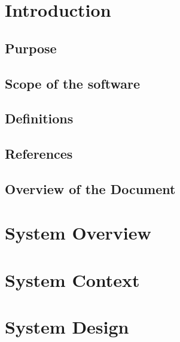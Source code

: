 \def\thedocument{User Requirements Document}
\def\thedate{DATE} %
\def\theversion{0.1}
\def\thestatus{Working copy}






\section{Introduction}
  \label{sec:introduction}
  \subsection{Purpose}
    \label{sec:purpose}
    
  \subsection{Scope of the software}
    \label{sec:scope_of_the_software}
    
  \subsection{Definitions} 
    \label{sec:definitions}
    
  \subsection{References}
    \label{sec:references}
    
  \subsection{Overview of the Document}
    \label{sec:overview_of_the_document}
    

\section{System Overview}
  \label{sec:system_overview}
  
\section{System Context}
  \label{sec:system_context}
  
\section{System Design}
  \label{sec:system_design}
